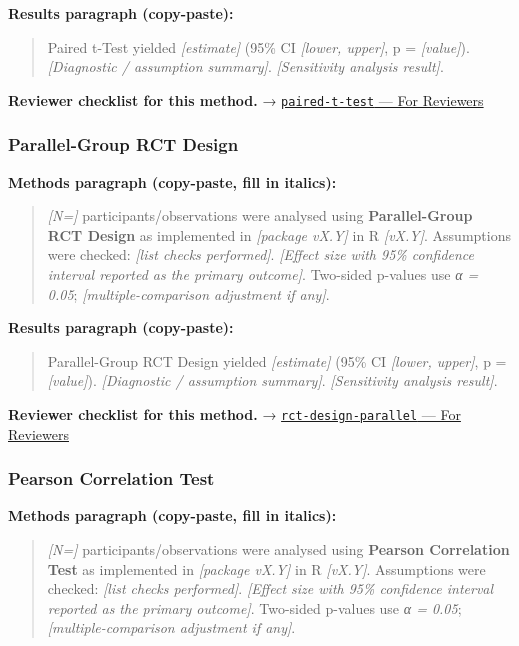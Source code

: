 \documentclass[
]{article}
\begin{document}
\textbf{Results paragraph (copy-paste):}

\begin{quote}
Paired t-Test yielded \emph{{[}estimate{]}} (95\% CI \emph{{[}lower,
upper{]}}, p = \emph{{[}value{]}}). \emph{{[}Diagnostic / assumption
summary{]}}. \emph{{[}Sensitivity analysis result{]}}.
\end{quote}

\textbf{Reviewer checklist for this method.} →
\href{../chapters/04-inferential/paired-t-test.Rmd\#for-reviewers}{\texttt{paired-t-test}
--- For Reviewers}

\subsubsection{Parallel-Group RCT
Design}\label{parallel-group-rct-design}

\textbf{Methods paragraph (copy-paste, fill in italics):}

\begin{quote}
\emph{{[}N={]}} participants/observations were analysed using
\textbf{Parallel-Group RCT Design} as implemented in \emph{{[}package
vX.Y{]}} in R \emph{{[}vX.Y{]}}. Assumptions were checked: \emph{{[}list
checks performed{]}}. \emph{{[}Effect size with 95\% confidence interval
reported as the primary outcome{]}}. Two-sided p-values use \emph{α =
0.05}; \emph{{[}multiple-comparison adjustment if any{]}}.
\end{quote}

\textbf{Results paragraph (copy-paste):}

\begin{quote}
Parallel-Group RCT Design yielded \emph{{[}estimate{]}} (95\% CI
\emph{{[}lower, upper{]}}, p = \emph{{[}value{]}}). \emph{{[}Diagnostic
/ assumption summary{]}}. \emph{{[}Sensitivity analysis result{]}}.
\end{quote}

\textbf{Reviewer checklist for this method.} →
\href{../chapters/14-clinical/rct-design-parallel.Rmd\#for-reviewers}{\texttt{rct-design-parallel}
--- For Reviewers}

\subsubsection{Pearson Correlation Test}\label{pearson-correlation-test}

\textbf{Methods paragraph (copy-paste, fill in italics):}

\begin{quote}
\emph{{[}N={]}} participants/observations were analysed using
\textbf{Pearson Correlation Test} as implemented in \emph{{[}package
vX.Y{]}} in R \emph{{[}vX.Y{]}}. Assumptions were checked: \emph{{[}list
checks performed{]}}. \emph{{[}Effect size with 95\% confidence interval
reported as the primary outcome{]}}. Two-sided p-values use \emph{α =
0.05}; \emph{{[}multiple-comparison adjustment if any{]}}.
\end{quote}
\end{document}
